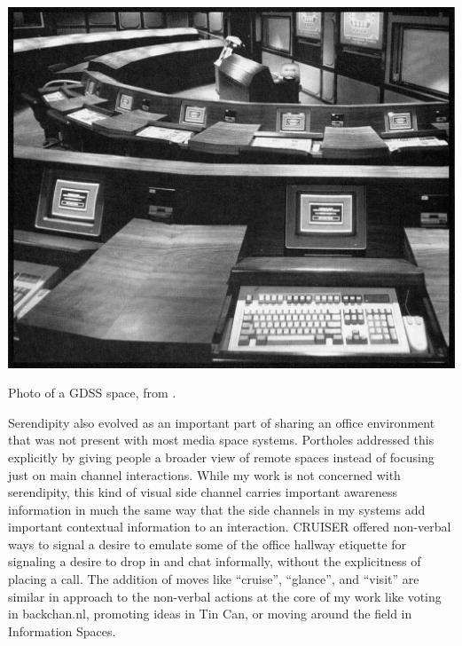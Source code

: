 \documentclass{tufte-handout}
\begin{document}


\begin{marginfigure}
	\includegraphics{figures/nunamaker_gdss.png}
	\caption{Photo of a GDSS space, from \citep{nunamaker_electronic_1991}.}
	\label{fig:gdss}
\end{marginfigure}




Serendipity also evolved as an important part of sharing an office environment that was not present with most media space systems. Portholes \citep{Dourish:1992fu} addressed this explicitly by giving people a broader view of remote spaces instead of focusing just on main channel interactions. While my work is not concerned with serendipity, this kind of visual side channel carries important awareness information in much the same way that the side channels in my systems add important contextual information to an interaction. CRUISER \citep{Fish:1992vz} offered non-verbal ways to signal a desire to emulate some of the office hallway etiquette for signaling a desire to drop in and chat informally, without the explicitness of placing a call. The addition of moves like ``cruise'', ``glance'', and ``visit'' are similar in approach to the non-verbal actions at the core of my work like voting in backchan.nl, promoting ideas in Tin Can, or moving around the field in Information Spaces. 
\end{document}
